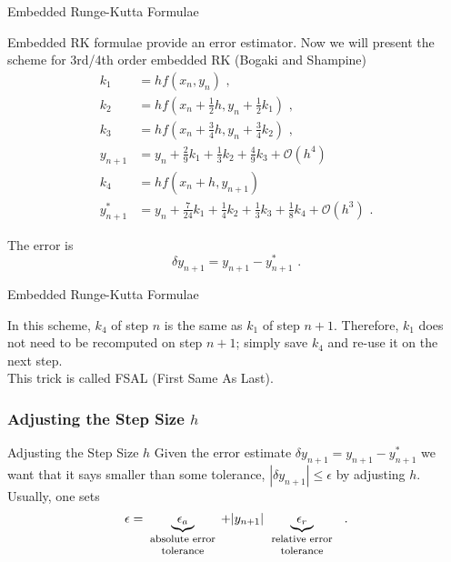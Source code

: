 \documentclass[11pt]{beamer}
\begin{document}
\begin{frame}[fragile]{Embedded Runge-Kutta Formulae}

Embedded RK formulae provide an error estimator.  Now we will present the scheme for  3rd/4th order embedded RK (Bogaki and Shampine)
\small
\begin{equation}
\begin{aligned}
k_1 &= h f(x_n, y_n)\,\,,\\
k_2 &= h f(x_n + \frac{1}{2} h, y_n + \frac{1}{2} k_1)\,\,,\\
k_3 &= h f(x_n + \frac{3}{4} h, y_n + \frac{3}{4} k_2)\,\,,\\
y_{n+1} &= y_n + \frac{2}{9} k_1 + \frac{1}{3} k_2 + \frac{4}{9} k_3 + \mathcal{O}(h^4)\,\,\\
k_4 &= h f(x_n + h, y_{n+1})\,\,\\
y^*_{n+1} &= y_n + \frac{7}{24} k_1 + \frac{1}{4}k_2 + \frac{1}{3}k_3 + \frac{1}{8} k_4 + \mathcal{O}(h^3)\,\,.
\end{aligned}
\end{equation}

The error is 
\begin{equation}
\delta y_{n+1} = y_{n+1} - y^*_{n+1}\,\,.
\end{equation}
\end{frame}

\begin{frame}[fragile]{Embedded Runge-Kutta Formulae}

In this scheme, $k_4$ of step $n$ is the same as $k_1$ of step $n+1$. Therefore, 
$k_1$ does not need to be recomputed on step $n+1$; simply
save $k_4$ and re-use it on the next step.\\
This trick is called 
FSAL (First Same As Last).
\end{frame}

\subsubsection{Adjusting the Step Size $h$}
\begin{frame}[fragile]{Adjusting the Step Size $h$}
Given the error estimate $\delta y_{n+1} = y_{n+1} - y^*_{n+1}$
we want that it says smaller than some tolerance, $|\delta y_{n+1}| \le
\epsilon$ by adjusting $h$.\\

Usually, one sets 
\begin{equation}
\epsilon = \underbrace{\epsilon_a}_{\parbox{2cm}{\footnotesize \centering absolute error tolerance}}
+ |y_{n+1}|\underbrace{\epsilon_r}_{\parbox{2cm}{\footnotesize \centering relative error tolerance}}\,\,.
\end{equation}
\end{frame}
\end{document}
